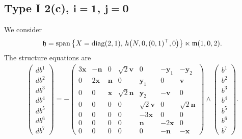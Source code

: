 \documentclass[pdftex]{sigma}
\numberwithin{equation}{section}
\newcommand\fh{{\frak h}}
\newcommand\fm{{\frak m}}
\newcommand\bx{{\mathbf x}}
\newcommand\by{{\mathbf y}}
\newcommand\bn{{\mathbf n}}
\newcommand\bv{{\mathbf v}}
\newcommand{\Span}{\operatorname{span}}
\newcommand{\diag}{\operatorname{diag}}
\begin{document}
\subsection[Type I 2(c), $i=1$, $j=0$]{Type I 2(c), $\boldsymbol{i=1}$, $\boldsymbol{j=0}$}
We consider
\begin{gather*}\fh=\Span\big\{X=\diag(2,1),\, h\big(N,0,(0,1)^\top,0\big) \big\}\ltimes\fm(1,0,2).\end{gather*}
The structure equations are
\begin{gather}\label{EI2(c)i=1}\left(\begin{matrix} db^1\\db^2\\db^3\\db^4\\db^5\\db^6\\db^7\end{matrix}\right) = -\left(
\begin{matrix}
3{\bx} &-\bn&0&\sqrt2 \bv&0&-\by_1&-\by_2\\
0&2\bx&\bn&0&\by_1&0&\bv\\
0&0&\bx&\sqrt 2 \bn&\by_2&-\bv&0\\
0&0&0&0&\sqrt2 \bv&0&\sqrt 2 \bn\\
0&0&0&0&-3\bx&0&0\\
0&0&0&0&\bn&-2\bx&0\\
0&0&0&0&0&-\bn&-\bx
\end{matrix}\right) \wedge \left(\begin{matrix} b^1\\b^2\\b^3\\b^4\\b^5\\b^6\\b^7\end{matrix}\right).
\end{gather}
\end{document}
